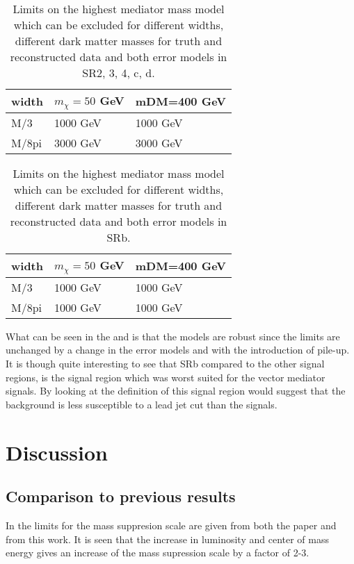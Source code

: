 \begin{table}[ht]
\begin{center}
\begin{tabular}{|l|l|l|}
\hline
width & $m_{\chi}=50$ GeV & mDM=400 GeV \\ \hline
M/3 & 1000 GeV & 1000 GeV \\ \hline
M/8pi & 3000 GeV & 3000 GeV\\ \hline
\end{tabular}
\caption{Limits on the highest mediator mass model which can be excluded for different widths, different dark matter masses for truth and reconstructed data and both error models in SR2, 3, 4, c, d.}
\label{tab:mediatorpass}
\end{center}
\end{table}
\begin{table}[ht]
\begin{center}
\begin{tabular}{|l|l|l|}
\hline
width & $m_{\chi}=50$ GeV & mDM=400 GeV \\ \hline
M/3 & 1000 GeV & 1000 GeV\\ \hline
M/8pi & 1000 GeV & 1000 GeV\\ \hline
\end{tabular}
\caption{Limits on the highest mediator mass model which can be excluded for different widths, different dark matter masses for truth and reconstructed data and both error models in SRb.}
\label{tab:mediatorpass2}
\end{center}
\end{table}

What can be seen in the  and  is that the models are robust since the limits are unchanged by a change in the error models and with the introduction of pile-up. It is though quite interesting to see that SRb compared to the other signal regions, is the signal region which was worst suited for the vector mediator signals. By looking at the definition of this signal region would suggest that the background is less susceptible to a lead jet cut than the signals.

\newpage
\section{Discussion}
\subsection{Comparison to previous results}
In  the limits for the mass suppresion scale are given from both the paper and from this work. It is seen that the increase in luminosity and center of mass energy gives an increase of the mass supression scale by a factor of 2-3.

